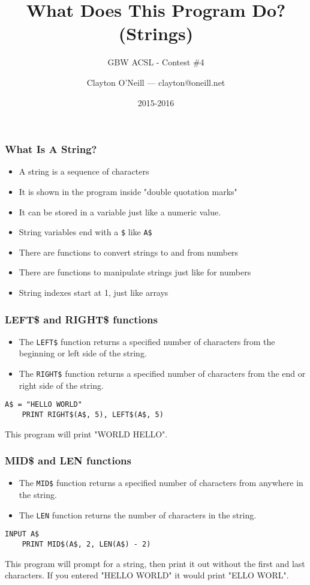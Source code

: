 \documentclass[handout,fleqn, t]{beamer}
\title{What Does This Program Do?\linebreak (Strings)}
\subtitle{GBW ACSL - Contest \#4}
\author{Clayton O'Neill --- clayton@oneill.net}
\date{2015-2016}
\begin{document}
\frame{\titlepage}

\begin{frame}
  \frametitle{What Is A String?}
  \begin{itemize}
    \item A string is a sequence of characters
    \item It is shown in the program inside "double quotation marks"
    \item It can be stored in a variable just like a numeric value.
    \item String variables end with a \lstinline{$} like \lstinline{A$}
    \item There are functions to convert strings to and from numbers
    \item There are functions to manipulate strings just like for numbers
    \item String indexes start at 1, just like arrays
  \end{itemize}
\end{frame}

\begin{frame}[fragile]
  \frametitle{LEFT\$ and RIGHT\$ functions}
  
  \begin{itemize}
    \item The \lstinline{LEFT$} function returns a specified number of characters from the beginning or left side of the string.
    \item The \lstinline{RIGHT$} function returns a specified number of characters from the end or right side of the string.
  \end{itemize}

  \begin{lstlisting}[gobble=4]
    A$ = "HELLO WORLD"
    PRINT RIGHT$(A$, 5), LEFT$(A$, 5)
  \end{lstlisting}
  
  This program will print "WORLD HELLO". 

\end{frame}

\begin{frame}[fragile]
  \frametitle{MID\$ and LEN functions}
  
  \begin{itemize}
    \item The \lstinline{MID$} function returns a specified number of characters from anywhere in the string.
    \item The \lstinline{LEN} function returns the number of characters in the string.
  \end{itemize}

  \begin{lstlisting}[gobble=4]
    INPUT A$
    PRINT MID$(A$, 2, LEN(A$) - 2)
  \end{lstlisting}
  
  This program will prompt for a string, then print it out without the first and last characters.  If you entered "HELLO WORLD" it would print "ELLO WORL".

\end{frame}
\end{document}
